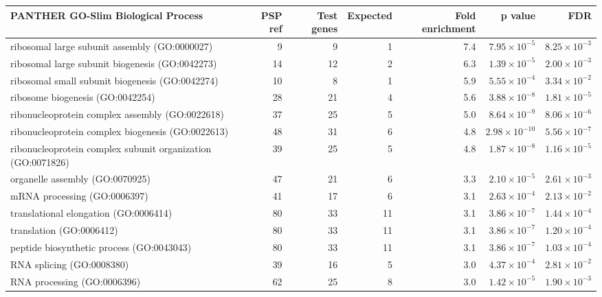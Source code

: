 \begin{table}[ht]
\centering
\begin{adjustbox}{width=\textwidth}
\begin{tabular}{lrrrrrr}
  \hline
PANTHER GO-Slim Biological Process & PSP ref & Test genes & Expected & Fold enrichment & p value & FDR \\ 
  \hline
ribosomal large subunit assembly (GO:0000027) & 9 & 9 & 1 & 7.4 & $7.95 \times 10^{-5}$ & $8.25 \times 10^{-3}$ \\ 
  ribosomal large subunit biogenesis (GO:0042273) & 14 & 12 & 2 & 6.3 & $1.39 \times 10^{-5}$ & $2.00 \times 10^{-3}$ \\ 
  ribosomal small subunit biogenesis (GO:0042274) & 10 & 8 & 1 & 5.9 & $5.55 \times 10^{-4}$ & $3.34 \times 10^{-2}$ \\ 
  ribosome biogenesis (GO:0042254) & 28 & 21 & 4 & 5.6 & $3.88 \times 10^{-8}$ & $1.81 \times 10^{-5}$ \\ 
  ribonucleoprotein complex assembly (GO:0022618) & 37 & 25 & 5 & 5.0 & $8.64 \times 10^{-9}$ & $8.06 \times 10^{-6}$ \\ 
  ribonucleoprotein complex biogenesis (GO:0022613) & 48 & 31 & 6 & 4.8 & $2.98 \times 10^{-10}$ & $5.56 \times 10^{-7}$ \\ 
  ribonucleoprotein complex subunit organization (GO:0071826) & 39 & 25 & 5 & 4.8 & $1.87 \times 10^{-8}$ & $1.16 \times 10^{-5}$ \\ 
  organelle assembly (GO:0070925) & 47 & 21 & 6 & 3.3 & $2.10 \times 10^{-5}$ & $2.61 \times 10^{-3}$ \\ 
  mRNA processing (GO:0006397) & 41 & 17 & 6 & 3.1 & $2.63 \times 10^{-4}$ & $2.13 \times 10^{-2}$ \\ 
  translational elongation (GO:0006414) & 80 & 33 & 11 & 3.1 & $3.86 \times 10^{-7}$ & $1.44 \times 10^{-4}$ \\ 
  translation (GO:0006412) & 80 & 33 & 11 & 3.1 & $3.86 \times 10^{-7}$ & $1.20 \times 10^{-4}$ \\ 
  peptide biosynthetic process (GO:0043043) & 80 & 33 & 11 & 3.1 & $3.86 \times 10^{-7}$ & $1.03 \times 10^{-4}$ \\ 
  RNA splicing (GO:0008380) & 39 & 16 & 5 & 3.0 & $4.37 \times 10^{-4}$ & $2.81 \times 10^{-2}$ \\ 
  RNA processing (GO:0006396) & 62 & 25 & 8 & 3.0 & $1.42 \times 10^{-5}$ & $1.90 \times 10^{-3}$ \\ 

\end{tabular}
\end{adjustbox}
\end{table}
